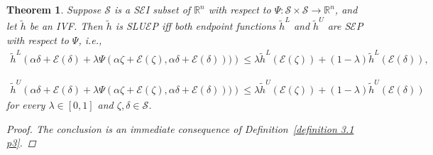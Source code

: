 \documentclass[12pt, reqno]{amsart}
\newtheorem{theorem}{Theorem}[section]
\theoremstyle{definition}
\theoremstyle{remark}
\numberwithin{equation}{section}
\begin{document}
\begin{theorem} \label{theorem 3.1 p4}
    Suppose $\mathcal{S}$ is a S$\mathcal{\mathcal{E}}$I subset of $\mathbb{R}^n$ with respect to $\Psi : \mathcal{S} \times \mathcal{S} \rightarrow \mathbb{R}^n$, and let $\tilde{h}$ be an IVF. Then $\tilde{h}$ is SLU$\mathcal{\mathcal{E}}$P iff both endpoint functions $\tilde{h}^L$ and $\tilde{h}^U$ are S$\mathcal{\mathcal{E}}$P with respect to $\Psi$, i.e.,
\begin{equation}
   \begin{aligned}
       \tilde{h}^L\left(\alpha \mathit{\delta}  + \mathcal{\mathcal{E}}(\mathit{\delta} ) + \lambda \Psi(\alpha \mathit{\zeta}  + \mathcal{\mathcal{E}}(\mathit{\zeta} ), \alpha \mathit{\delta}  + \mathcal{\mathcal{E}}(\mathit{\delta} )))\right) 
       \leq \lambda \tilde{h}^L(\mathcal{\mathcal{E}}(\mathit{\zeta} )) + (1 - \lambda) \tilde{h}^L(\mathcal{\mathcal{E}}(\mathit{\delta} )),
   \end{aligned}
\end{equation}

\begin{equation}
    \begin{aligned}
        \tilde{h}^U\left(\alpha \mathit{\delta}  + \mathcal{\mathcal{E}}(\mathit{\delta} ) + \lambda \Psi(\alpha \mathit{\zeta}  + \mathcal{\mathcal{E}}(\mathit{\zeta} ), \alpha \mathit{\delta}  + \mathcal{\mathcal{E}}(\mathit{\delta} )))\right) 
        \leq \lambda \tilde{h}^U(\mathcal{\mathcal{E}}(\mathit{\zeta} )) + (1 - \lambda) \tilde{h}^U(\mathcal{\mathcal{E}}(\mathit{\delta} ))
    \end{aligned}
\end{equation}
for every $\lambda \in [0,1]$ and $\mathit{\zeta} , \mathit{\delta}  \in \mathcal{S}$.
\begin{proof}
     The conclusion is an immediate consequence of Definition~\ref{definition 3.1 p3}.
\end{proof}
\end{theorem}
\end{document}
